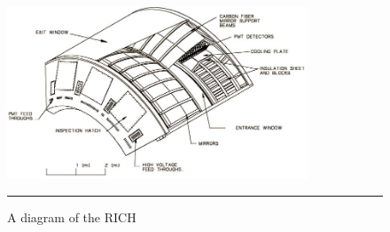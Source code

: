 \begin{figure}[h!]
  \centering
    \includegraphics[width=0.8\textwidth]{Figures/RICHdiagram.jpg}
    \rule{35em}{0.5pt}
  \caption[A diagram of the RICH]{A diagram of the RICH}
  \label{fig:RICHdiagram}
\end{figure}

